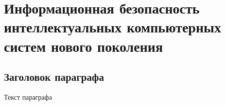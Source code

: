 
\chapter{Информационная безопасность интеллектуальных компьютерных систем нового поколения}
\label{chapter_security}


\section{Заголовок параграфа}
Текст параграфа

%
